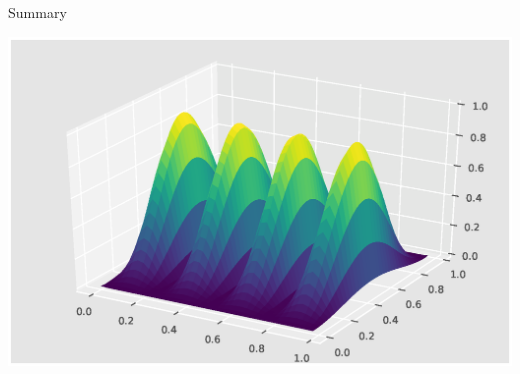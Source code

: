 \documentclass[mathserif]{beamer}
\begin{document}
\begin{frame}{Summary}

\center \includegraphics[scale=0.45]{psi10.eps}

\end{frame}
\end{document}
